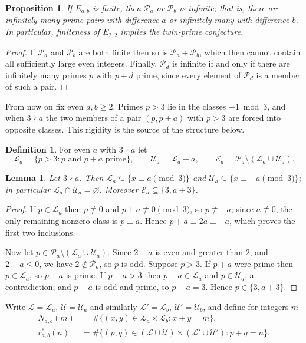 \documentclass[11pt]{amsart}
\newtheorem{proposition}[theorem]{Proposition}
\newtheorem{lemma}[theorem]{Lemma}
\theoremstyle{definition}
\newtheorem{definition}[theorem]{Definition}
\theoremstyle{remark}
\newcommand{\PP}{\mathcal{P}}
\newcommand{\Ls}{\mathcal{L}}
\newcommand{\Us}{\mathcal{U}}
\newcommand{\Es}{\mathcal{E}}
\begin{document}
\begin{proposition}\label{prop:polignac}
If $E_{a,b}$ is finite, then $\PP_a$ or $\PP_b$ is infinite; that is, there are infinitely many prime pairs with difference $a$ or infinitely many with difference $b$. In particular, finiteness of $E_{2,2}$ implies the twin-prime conjecture.
\end{proposition}

\begin{proof}
If $\PP_a$ and $\PP_b$ are both finite then so is $\PP_a+\PP_b$, which then cannot contain all sufficiently large even integers. Finally, $\PP_d$ is infinite if and only if there are infinitely many primes $p$ with $p+d$ prime, since every element of $\PP_d$ is a member of such a pair.
\end{proof}

From now on fix even $a,b\ge 2$. Primes $p>3$ lie in the classes $\pm1\bmod 3$, and when $3\nmid a$ the two members of a pair $(p,p+a)$ with $p>3$ are forced into opposite classes. This rigidity is the source of the structure below.

\begin{definition}
For even $a$ with $3\nmid a$ let
\[
\Ls_a=\{p>3: p \text{ and } p+a \text{ prime}\},\qquad \Us_a=\Ls_a+a,\qquad \Es_a=\PP_a\setminus(\Ls_a\cup\Us_a).
\]
\end{definition}

\begin{lemma}\label{lem:classes}
Let $3\nmid a$. Then $\Ls_a\subseteq\{x\equiv a\pmod 3\}$ and $\Us_a\subseteq\{x\equiv -a\pmod 3\}$; in particular $\Ls_a\cap\Us_a=\varnothing$. Moreover $\Es_a\subseteq\{3,a+3\}$.
\end{lemma}

\begin{proof}
If $p\in\Ls_a$ then $p\not\equiv 0$ and $p+a\not\equiv 0\pmod 3$, so $p\not\equiv -a$; since $a\not\equiv 0$, the only remaining nonzero class is $p\equiv a$. Hence $p+a\equiv 2a\equiv -a$, which proves the first two inclusions.

Now let $p\in\PP_a\setminus(\Ls_a\cup\Us_a)$. Since $2+a$ is even and greater than $2$, and $2-a\le 0$, we have $2\notin\PP_a$, so $p$ is odd. Suppose $p>3$. If $p+a$ were prime then $p\in\Ls_a$, so $p-a$ is prime. If $p-a>3$ then $p-a\in\Ls_a$ and $p\in\Us_a$, a contradiction; and $p-a$ is odd and prime, so $p-a=3$. Hence $p\in\{3,a+3\}$.
\end{proof}

Write $\Ls=\Ls_a$, $\Us=\Us_a$ and similarly $\Ls'=\Ls_b$, $\Us'=\Us_b$, and define for integers $m$
\begin{align*}
N_{a,b}(m)&=\#\{(x,y)\in\Ls_a\times\Ls_b: x+y=m\},\\
r^*_{a,b}(n)&=\#\{(p,q)\in(\Ls\cup\Us)\times(\Ls'\cup\Us'): p+q=n\}.
\end{align*}
\end{document}
